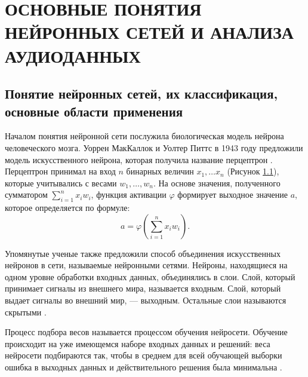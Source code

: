 \chapter{ОСНОВНЫЕ ПОНЯТИЯ НЕЙРОННЫХ СЕТЕЙ И АНАЛИЗА АУДИОДАННЫХ}
\section{Понятие нейронных сетей, их классификация, основные области применения}
Началом понятия нейронной сети послужила биологическая модель нейрона человеческого мозга.
Уоррен МакКаллок и Уолтер Питтс  в 1943 году предложили модель искусственного нейрона, 
которая получила название перцептрон \cite{mcculoch}. 
Перцептрон принимал на вход $n$ бинарных величин $x_1, \dots x_n$ (Рисунок \ref{fig:perceptron}),
которые учитывались с весами $w_1, \dots, w_n$. На основе значения, полученного сумматором $\sum_{i=1}^n x_i w_i$, функция активации
$\varphi$ формирует выходное значение $a$, которое определяется по формуле:
\begin{equation}
    a = \varphi \left( \sum\limits_{i=1}^n x_i w_i \right).
\end{equation}

\begin{figure}[H]
	\caption{}
	\label{fig:perceptron}
\end{figure}

Упомянутые ученые также предложили способ объединения искусственных нейронов в сети, называемые нейронными сетями.
Нейроны, находящиеся на одном уровне обработки входных данных, объединялись в слои.
Слой, который принимает сигналы из внешнего мира, называется входным. Слой, который выдает сигналы во внешний мир, —
выходным. Остальные слои называются скрытыми \cite{sozykin}.

Процесс подбора весов называется процессом обучения нейросети.
Обучение происходит на уже имеющемся наборе входных данных и
решений: веса нейросети подбираются так, чтобы в среднем для всей
обучающей выборки ошибка в выходных данных и действительного
решения была минимальна \cite{cyber_alex}.

